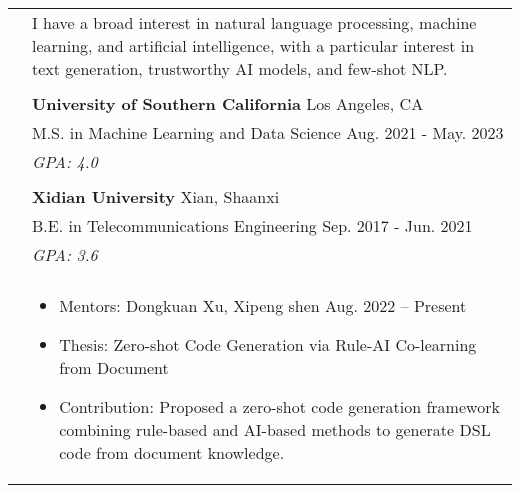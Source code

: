 \documentclass[letterpaper, 11pt]{article}
\begin{document}
\begin{longtable}{p{1.3in}p{4.8in}}



\nohyphens{\color{black}{Research interests}}
& I have a broad interest in natural language processing, machine learning, and artificial intelligence, with a particular interest in text generation, trustworthy AI models, and few-shot NLP. \\
& \\




\color{black}{Education} & \textbf{University of Southern California} \hfill Los Angeles, CA \\
& M.S. in Machine Learning and Data Science \hfill Aug. 2021 - May. 2023\\
& {\it GPA: 4.0}\\
& \\

& \textbf{Xidian University} \hfill Xian, Shaanxi\\
& B.E. in Telecommunications Engineering \hfill Sep. 2017 - Jun. 2021 \\
& {\it GPA: 3.6}\\
& \\





\nohyphens{\color{black}{Research experience}} 

&  \begin{itemize}[leftmargin=10pt, itemsep=-5pt, topsep=0pt,before=\textbf{North Carolina State University}]
    \item Mentors: Dongkuan Xu, Xipeng shen \hfill Aug. 2022 -- Present 
    \item Thesis: Zero-shot Code Generation via Rule-AI Co-learning from Document
    \item Contribution: Proposed a zero-shot code generation framework combining rule-based and AI-based methods to generate DSL code from document knowledge.
  \end{itemize}\\ 
  


\end{longtable}
\end{document}
